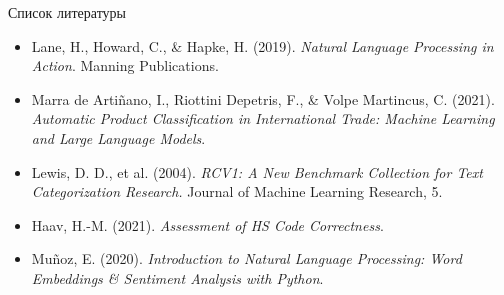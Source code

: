 \documentclass{beamer}
\begin{document}
\begin{frame}{Список литературы}
\begin{itemize}
    \item Lane, H., Howard, C., \& Hapke, H. (2019). \textit{Natural Language Processing in Action}. Manning Publications. 
    \item Marra de Artiñano, I., Riottini Depetris, F., \& Volpe Martincus, C. (2021). \textit{Automatic Product Classification in International Trade: Machine Learning and Large Language Models}. 
    \item Lewis, D. D., et al. (2004). \textit{RCV1: A New Benchmark Collection for Text Categorization Research.} Journal of Machine Learning Research, 5. 
    \item Haav, H.-M. (2021). \textit{Assessment of HS Code Correctness}. 
    \item Muñoz, E. (2020). \textit{Introduction to Natural Language Processing: Word Embeddings \& Sentiment Analysis with Python}. 
\end{itemize}
\end{frame}

\end{document}
